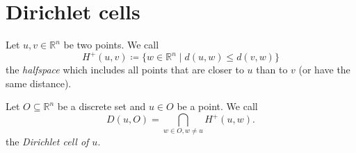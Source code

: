 \documentclass{beamer}
\theoremstyle{plain}
\newcommand\R{\mathbb R}
\begin{document}
\begin{frame}
\end{frame}

\section{Dirichlet cells}
\begin{frame}
    \begin{definition}\label{def:halfspace}
        Let $u, v \in \R^n$ be two points. 
        We call \pause
        $$
            H^+(u, v) \coloneqq \{ w \in \R^n \mid d(u,w) \leq d(v, w) \}
        $$
        the \emph{halfspace} which includes all points that are closer to $u$ than to $v$ (or have the same distance).
    \end{definition}\pause

    \begin{definition}
        Let $O\subseteq \R^n$ be a discrete set and $u \in O$ be a point.
        We call 
        $$
            D(u, O) = \bigcap_{w \in O, w \neq u} H^+(u, w).
        $$
        the \emph{Dirichlet cell of $u$}.
    \end{definition}
\end{frame}
\end{document}
